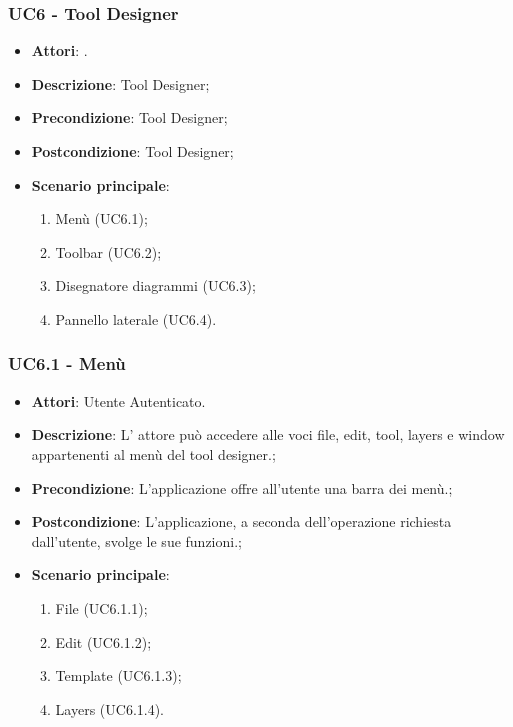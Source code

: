 \subsubsection{UC6 - Tool Designer} 
\label{sssec:UC6} 
\begin{itemize} 
\item \textbf{Attori}: .
\item \textbf{Descrizione}: Tool Designer;
\item \textbf{Precondizione}: Tool Designer;
\item \textbf{Postcondizione}: Tool Designer;
\item \textbf{Scenario principale}: \begin{enumerate}\item Menù (UC6.1);\item Toolbar (UC6.2);\item Disegnatore diagrammi (UC6.3);\item Pannello laterale (UC6.4). 
 \end{enumerate}
\end{itemize} 
\subsubsection{UC6.1 - Menù} 
\label{sssec:UC6.1} 
\begin{itemize} 
\item \textbf{Attori}: Utente Autenticato.
\item \textbf{Descrizione}: L’ attore può accedere alle voci file, edit, tool,
layers e window appartenenti al menù del tool designer.;
\item \textbf{Precondizione}: L’applicazione offre all’utente una barra dei menù.;
\item \textbf{Postcondizione}: L’applicazione, a seconda dell’operazione richiesta dall’utente,
svolge le sue funzioni.;
\item \textbf{Scenario principale}: \begin{enumerate}\item File (UC6.1.1);\item Edit (UC6.1.2);\item Template (UC6.1.3);\item Layers (UC6.1.4). 
 \end{enumerate}
\end{itemize} 
